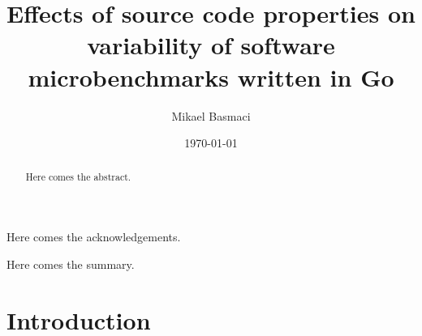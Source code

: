 \documentclass{seal_thesis}
\date{\today}
\title{Effects of source code properties on variability of software microbenchmarks written in Go}
\author{Mikael Basmaci}
\begin{document}
\maketitle

\frontmatter

\begin{acknowledgements}
	Here comes the acknowledgements.
\end{acknowledgements}

\begin{abstract}
	Here comes the abstract.
\end{abstract}

\begin{zusammenfassung}
	Here comes the summary.
\end{zusammenfassung}

\tableofcontents
\listoffigures
\listoftables
\lstlistoflistings

\mainmatter

\chapter{Introduction}
\end{document}
